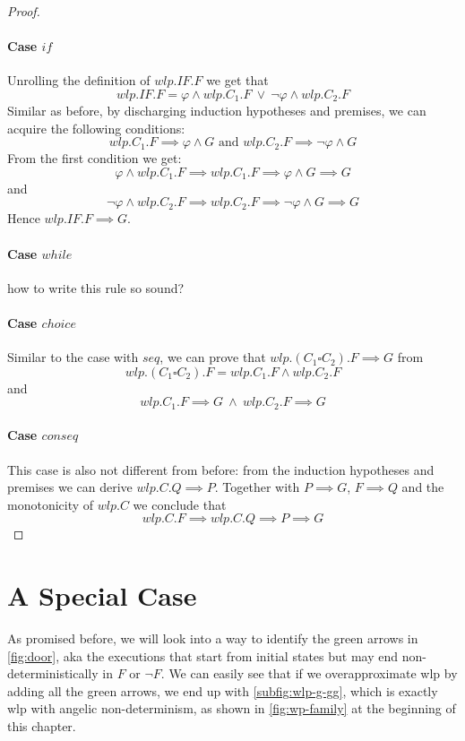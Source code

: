 \begin{proof}
	\paragraph{Case $if$}
	Unrolling the definition of $wlp.IF.F$ we get that 
	$$wlp.IF.F = \varphi\wedge wlp.C_1.F\ \vee\ \neg\varphi\wedge wlp.C_2.F$$ 
	Similar as before, by discharging induction hypotheses and premises, we can acquire the following conditions: 
	$$wlp.C_1.F\implies\varphi\wedge G \text{ and }
	 wlp.C_2.F\implies\neg\varphi\wedge G $$
	From the first condition we get: 
	$$\varphi\wedge wlp.C_1.F\implies wlp.C_1.F \implies \varphi\wedge G\implies G$$
	and 
	$$\neg\varphi\wedge wlp.C_2.F\implies wlp.C_2.F \implies \neg\varphi\wedge G\implies G$$
	Hence $wlp.IF.F \implies G$. 
	\paragraph{Case $while$}
	\colorbox{red!30}{
		how to write this rule so sound? 
	}%
	\paragraph{Case $choice$} Similar to the case with $seq$, we can prove that $wlp.(C_1\square C_2).F \implies G$ from 
	$$wlp.(C_1\square C_2).F = wlp.C_1.F \wedge wlp.C_2.F$$
	and 
	$$wlp.C_1.F \implies G\ \wedge\ wlp.C_2.F \implies G$$

	\paragraph{Case $conseq$}
	This case is also not different from before: from the induction hypotheses and premises we can derive $wlp.C.Q \implies P$. 
	Together with $P\implies G$, $F\implies Q$ and the monotonicity of $wlp.C$ we conclude that 
	$$wlp.C.F\implies wlp.C.Q \implies P \implies G$$
\end{proof}

\section{A Special Case}\label{sec:special} %
As promised before, we will look into a way to identify the green arrows in \autoref{fig:door}, aka the executions that start from initial states but may end non-deterministically in $F$ or $\neg F$. 
We can easily see that if we overapproximate wlp by adding all the green arrows, we end up with \autoref{subfig:wlp-g-gg}, which is exactly wlp with angelic non-determinism, as shown in \autoref{fig:wp-family} at the beginning of this chapter. 

